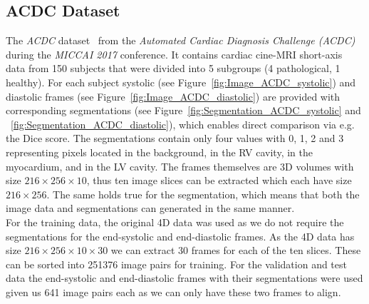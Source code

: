 \subsection{ACDC Dataset} \label{SubSec:ACDC}
The \emph{ACDC} dataset~\cite{ACDC} from the \emph{Automated Cardiac Diagnosis Challenge (ACDC)} during the \emph{MICCAI 2017} conference. It contains cardiac cine-MRI short-axis data from 150 subjects that were divided into 5 subgroups (4 pathological, 1 healthy). For each subject systolic (see Figure~\ref{fig:Image_ACDC_systolic}) and diastolic frames (see Figure~\ref{fig:Image_ACDC_diastolic}) are provided with corresponding segmentations (see Figure~\ref{fig:Segmentation_ACDC_systolic} and ~\ref{fig:Segmentation_ACDC_diastolic}), which enables direct comparison via e.g. the Dice score. The segmentations contain only four values with 0, 1, 2 and 3 representing pixels located in the background, in the RV cavity, in the myocardium, and in the LV cavity. The frames themselves are 3D volumes with size $216 \times 256 \times 10$, thus ten image slices can be extracted which each have size $216 \times 256$. The same holds true for the segmentation, which means that both the image data and segmentations can generated in the same manner.\\
For the training data, the original 4D data was used as we do not require the segmentations for the end-systolic and end-diastolic frames. As the 4D data has size $216 \times 256 \times 10 \times 30$ we can extract 30 frames for each of the ten slices. These can be sorted into 251376 image pairs for training. For the validation and test data the end-systolic and end-diastolic frames with their segmentations were used given us 641 image pairs each as we can only have these two frames to align.

